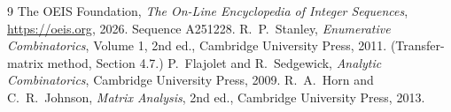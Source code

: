 \documentclass[11pt,a4paper]{article}
\theoremstyle{plain}
\theoremstyle{definition}
\begin{document}
\begin{thebibliography}{9}
 The OEIS Foundation, \emph{The On-Line Encyclopedia of Integer
Sequences}, \url{https://oeis.org}, 2026. Sequence A251228.
 R.~P.~Stanley, \emph{Enumerative Combinatorics}, Volume 1, 2nd ed.,
Cambridge University Press, 2011. (Transfer-matrix method, Section 4.7.)
 P.~Flajolet and R.~Sedgewick, \emph{Analytic Combinatorics}, Cambridge
University Press, 2009.
 R.~A.~Horn and C.~R.~Johnson, \emph{Matrix Analysis}, 2nd ed., Cambridge
University Press, 2013.
\end{thebibliography}
\end{document}
